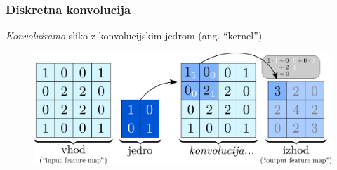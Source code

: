 \documentclass[14pt, t]{beamer}
\begin{document}
\begin{frame}
    \frametitle{Diskretna konvolucija}

    \vspace{5mm}

    \textit{Konvoluiramo} sliko z konvolucijskim jedrom (ang. ``kernel'')

    \begin{figure}[htb!]
        \centering
        \includegraphics[width=\linewidth]{vector/figures-slo/conv-single-channel.pdf}
    \end{figure}

\end{frame}
\end{document}
